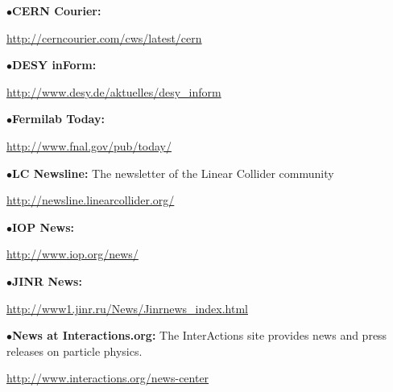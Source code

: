 \item{$\bullet$}{\bf CERN Courier:}
	\item{}\qquad\url{http://cerncourier.com/cws/latest/cern}
\medskip

\item{$\bullet$}{\bf DESY inForm:}
	\item{}\qquad\url{http://www.desy.de/aktuelles/desy\_inform}
\medskip

\item{$\bullet$}{\bf Fermilab Today:}
	\item{}\qquad\url{http://www.fnal.gov/pub/today/}
\medskip

\item{$\bullet$}{\bf LC Newsline:}
The newsletter of the Linear Collider community
	\item{}\qquad\url{http://newsline.linearcollider.org/}
	\item{}
\medskip

\item{$\bullet$}{\bf IOP News:}
     \item{}\qquad\url{http://www.iop.org/news/}

\medskip

\item{$\bullet$}{\bf JINR News:}
 \item{}\qquad\url{http://www1.jinr.ru/News/Jinrnews\_index.html}

\medskip

\item{$\bullet$}{\bf News at Interactions.org:}
The InterActions site provides news and press releases on particle physics.
     \item{}\qquad\url{http://www.interactions.org/news-center}
     \item{}

\medskip





